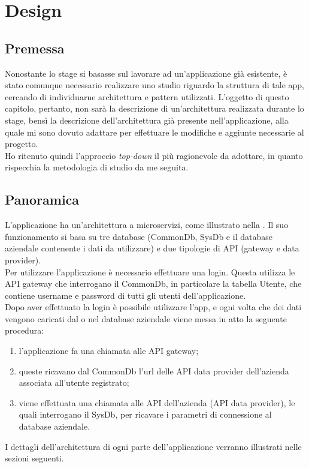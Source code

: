 \chapter{Design}
\label{cap:design}


\section{Premessa}

Nonostante lo stage si basasse sul lavorare ad un'applicazione già esistente, è stato comunque necessario realizzare uno studio riguardo la struttura di tale app, cercando di individuarne architettura e pattern utilizzati. L'oggetto di questo capitolo, pertanto, non sarà la descrizione di un'architettura realizzata durante lo stage, bensì la descrizione dell'architettura già presente nell'applicazione, alla quale mi sono dovuto adattare per effettuare le modifiche e aggiunte necessarie al progetto.\\
Ho ritenuto quindi l'approccio \emph{top-down} il più ragionevole da adottare, in quanto rispecchia la metodologia di studio da me seguita.

\section{Panoramica}

L'applicazione ha un'architettura a microservizi, come illustrato nella . Il suo funzionamento si basa su tre database (CommonDb, SysDb e il database aziendale contenente i dati da utilizzare) e due tipologie di \gls{API} (gateway e data provider).\\
Per utilizzare l'applicazione è necessario effettuare una login. Questa utilizza le \gls{API} gateway che interrogano il CommonDb, in particolare la tabella Utente, che contiene username e password di tutti gli utenti dell'applicazione.\\
Dopo aver effettuato la login è possibile utilizzare l'app, e ogni volta che dei dati vengono caricati dal o nel database aziendale viene messa in atto la seguente procedura:
\begin{enumerate}
    \item l'applicazione fa una chiamata alle \gls{API} gateway;
    \item queste ricavano dal CommonDb l'url delle \gls{API} data provider dell'azienda associata all'utente registrato;
    \item viene effettuata una chiamata alle \gls{API} dell'azienda (\gls{API} data provider), le quali interrogano il SysDb, per ricavare i parametri di connessione al database aziendale.
\end{enumerate}
I dettagli dell'architettura di ogni parte dell'applicazione verranno illustrati nelle sezioni seguenti.

